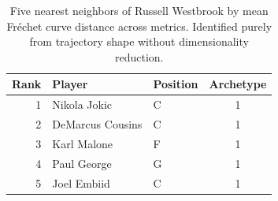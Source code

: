 \begin{table}[htbp]
  \centering\small
  \begin{tabular}{rllc}
    \toprule
    Rank & Player & Position & Archetype \\
    \midrule
    1 & Nikola Jokic & C & 1 \\
    2 & DeMarcus Cousins & C & 1 \\
    3 & Karl Malone & F & 1 \\
    4 & Paul George & G & 1 \\
    5 & Joel Embiid & C & 1 \\
    \bottomrule
  \end{tabular}
  \caption{Five nearest neighbors of Russell Westbrook by mean Fr\'{e}chet curve distance across metrics. Identified purely from trajectory shape without dimensionality reduction.}
  \label{tab:Russell_Westbrook_frechet_curve_neighbors}
\end{table}

